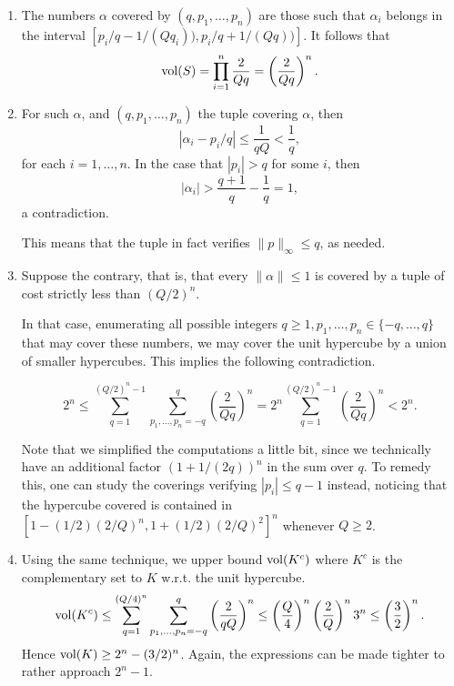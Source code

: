 \documentclass[12pt,a4paper]{article}
\theoremstyle{plain}
\theoremstyle{definition}
\begin{document}
{
	\begin{enumerate}
		\item The numbers $\alpha$ covered by $(q, p_1, \dots, p_n)$ are those such that $\alpha_i$ belongs in the interval $[p_i/q - 1/(Qq_i)), p_i/q + 1/(Qq))]$.
		It follows that
			\[ {\rm vol}(S)  =\prod_{i=1}^n \frac{2}{Qq} = \left( \frac{2}{Qq} \right)^n. \]

		\item For such $\alpha$, and $(q, p_1, \dots, p_n)$ the tuple covering $\alpha$, then
			\[ | \alpha_i - p_i/q | \leq \frac1{qQ} < \frac1q, \]
		for each $i=1, \dots, n$. 
		In the case that $|p_i| > q$ for some $i$, then
			\[ | \alpha_i | > \frac{q+1}q - \frac1q = 1, \]
		a contradiction.
	
		This means that the tuple in fact verifies $\| p \|_\infty \leq q$, as needed.

		\item Suppose the contrary, that is, that every $\| \alpha \| \leq 1$ is covered by a tuple of cost strictly less than $(Q/2)^n$.

		In that case, enumerating all possible integers $q \geq 1, p_1, \dots, p_n \in \{-q, \dots, q\}$ that may cover these numbers, we may cover the unit hypercube by a union of smaller hypercubes.
		This implies the following contradiction.
	
		\[ 2^n \leq \sum_{q=1}^{(Q/2)^n -1} \sum_{p_1, \dots, p_n = -q}^{q} \left( \frac{2}{Qq} \right)^n =  2^n \sum_{q=1}^{(Q/2)^n -1} \left( \frac{2}{Qq} \right)^n< 2^n. \]
	
		Note that we simplified the computations a little bit, since we technically have an additional factor $(1+1/(2q))^n$ in the sum over $q$.
		To remedy this, one can study the coverings verifying $|p_i| \leq q-1$ instead, noticing that the hypercube covered is contained in $[1- (1/2) (2/Q)^n, 1 + (1/2) (2/Q)^2]^n$ whenever $Q \geq 2$.

		\item Using the same technique, we upper bound ${\rm vol}(K^c)$ where $K^c$ is the complementary set to $K$ w.r.t. the unit hypercube.
		\[ {\rm vol}(K^c) \leq \sum_{q=1}^{(Q/4)^n} \sum_{p_1, \dots, p_n = -q}^q \left( \frac{2}{qQ} \right)^n \leq \left( \frac{Q}4 \right)^n \left( \frac{2}{Q} \right)^n 3^n \leq \left( \frac32 \right)^n. \]
		Hence ${\rm vol}(K) \geq 2^n - (3/2)^n$.
		Again, the expressions can be made tighter to rather approach $2^n -1$.

	\end{enumerate}

}
\end{document}
